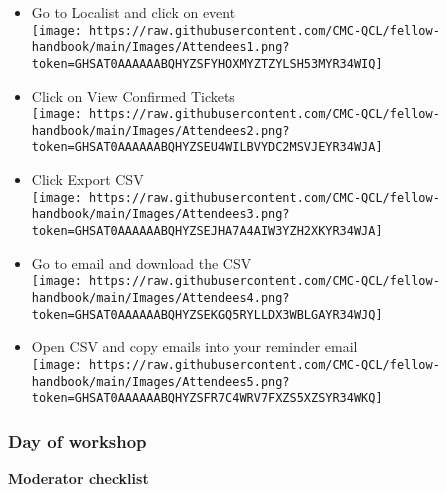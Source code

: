 \documentclass[
]{book}
\begin{document}
\begin{itemize}
\item
  Go to Localist and click on event\\
  \texttt{[image: https://raw.githubusercontent.com/CMC-QCL/fellow-handbook/main/Images/Attendees1.png?token=GHSAT0AAAAAABQHYZSFYHOXMYZTZYLSH53MYR34WIQ]}
\item
  Click on View Confirmed Tickets\\
  \texttt{[image: https://raw.githubusercontent.com/CMC-QCL/fellow-handbook/main/Images/Attendees2.png?token=GHSAT0AAAAAABQHYZSEU4WILBVYDC2MSVJEYR34WJA]}
\item
  Click Export CSV\\
  \texttt{[image: https://raw.githubusercontent.com/CMC-QCL/fellow-handbook/main/Images/Attendees3.png?token=GHSAT0AAAAAABQHYZSEJHA7A4AIW3YZH2XKYR34WJA]}
\item
  Go to email and download the CSV\\
  \texttt{[image: https://raw.githubusercontent.com/CMC-QCL/fellow-handbook/main/Images/Attendees4.png?token=GHSAT0AAAAAABQHYZSEKGQ5RYLLDX3WBLGAYR34WJQ]}
\item
  Open CSV and copy emails into your reminder email\\
  \texttt{[image: https://raw.githubusercontent.com/CMC-QCL/fellow-handbook/main/Images/Attendees5.png?token=GHSAT0AAAAAABQHYZSFR7C4WRV7FXZS5XZSYR34WKQ]}
\end{itemize}

\hypertarget{day-of-workshop}{%
\subsubsection{\texorpdfstring{Day of workshop }{Day of workshop }}\label{day-of-workshop}}

\textbf{Moderator checklist}
\end{document}
